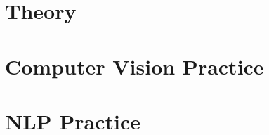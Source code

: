 \documentclass{book}
\begin{document}
\frontmatter




\mainmatter
\tableofcontents

\part{Theory}









\part{Computer Vision Practice}





\part{NLP Practice}




% 
\backmatter


\end{document}
